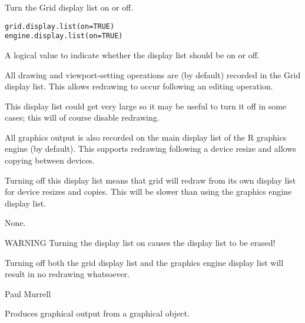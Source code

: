 %
\begin{Description}\relax
Turn the Grid display list on or off.
\end{Description}
%
\begin{Usage}
\begin{verbatim}
grid.display.list(on=TRUE)
engine.display.list(on=TRUE)
\end{verbatim}
\end{Usage}
%
\begin{Arguments}
\begin{ldescription}
\item[\code{on}] A logical value to indicate whether the display list
should be on or off.
\end{ldescription}
\end{Arguments}
%
\begin{Details}\relax
All drawing and viewport-setting operations are (by default)
recorded in the Grid display list.  This allows redrawing
to occur following an editing operation.

This display list could get very large so it may be useful to
turn it off in some cases;  this will of course disable redrawing.

All graphics output is also recorded on the main display list
of the R graphics engine (by default).  This supports redrawing
following a device resize and allows copying between devices.

Turning off this display list means that grid will redraw from its
own display list for device resizes and copies.  This will be slower
than using the graphics engine display list.
\end{Details}
%
\begin{Value}
None.
\end{Value}
%
\begin{Section}{WARNING}
Turning the display list on causes the display list to be erased!

Turning off both the grid display list and the graphics engine
display list will result in no redrawing whatsoever.
\end{Section}
%
\begin{Author}\relax
Paul Murrell
\end{Author}
%
\begin{Description}\relax
Produces graphical output from a graphical object.
\end{Description}
